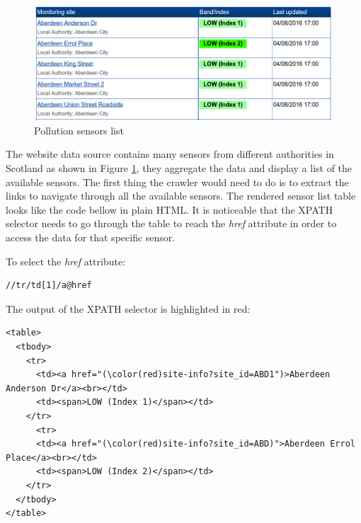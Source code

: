 \begin{figure}[H]
\begin{adjustbox}{width=.5\textwidth,center=\textwidth}
  \centering
  \includegraphics[scale=1]{images/monitoring_summary.png}
\end{adjustbox}
  \caption[Pollution sensors list]{Pollution sensors list \footnotemark}
  \label{fig:pollution_sensors_list}
\end{figure}

The website data source contains many sensors from different authorities in Scotland as shown in Figure \ref{fig:pollution_sensors_list}, they aggregate the data and display a list of the available sensors. The first thing the crawler would need to do is to extract the links to navigate through all the available sensors. The rendered sensor list table looks like the code bellow in plain HTML. It is noticeable that the XPATH selector needs to go through the table to reach the \textit{href} attribute in order to access the data for that specific sensor. 

To select the \textit{href} attribute: \bigskip

{\centering
\begin{BVerbatim}
//tr/td[1]/a@href
\end{BVerbatim}
\par
}\bigskip

The output of the XPATH selector is highlighted in red: 

\begin{Verbatim}[fontsize=\small,commandchars=\\\(\)]
<table>
  <tbody>
    <tr>
      <td><a href="(\color(red)site-info?site_id=ABD1")>Aberdeen Anderson Dr</a><br></td>
      <td><span>LOW (Index 1)</span></td>
    </tr>
      <tr>
      <td><a href="(\color(red)site-info?site_id=ABD)">Aberdeen Errol Place</a><br></td>
      <td><span>LOW (Index 2)</span></td>
    </tr>
  </tbody>
</table>
\end{Verbatim}

